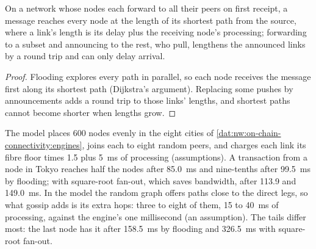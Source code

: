 \begin{proposition}\label{prop:nw:on-chain-connectivity:gossip}
On a network whose nodes each forward to all their peers on first receipt, a message reaches every node at the length of its shortest path
from the source, where a link's length is its delay plus the receiving node's processing; forwarding to a subset and announcing to the rest, who
pull, lengthens the announced links by a round trip and can only delay arrival.
\end{proposition}

\begin{proof}
Flooding explores every path in parallel, so each node receives the message first along its shortest path (Dijkstra's argument). Replacing some
pushes by announcements adds a round trip to those links' lengths, and shortest paths cannot become shorter when lengths grow.
\end{proof}

\label{lst:nw:on-chain-connectivity:spread}

The model places 600 nodes evenly in the eight cities of \cref{dat:nw:on-chain-connectivity:engines}, joins each to eight random peers, and
charges each link its fibre floor times 1.5 plus \qty{5}{\milli\second} of processing (assumptions). A transaction from a node in Tokyo reaches
half the nodes after \qty{85.0}{\milli\second} and nine-tenths after \qty{99.5}{\milli\second} by flooding; with square-root fan-out, which
saves bandwidth, after 113.9 and \qty{149.0}{\milli\second}. In the model the random graph offers paths close to the direct legs,
so what gossip adds is its extra hops: three to eight of them, 15 to \qty{40}{\milli\second} of processing, against the engine's one
millisecond (an assumption). The tails differ most: the last node has it after \qty{158.5}{\milli\second} by flooding and
\qty{326.5}{\milli\second} with square-root fan-out.

